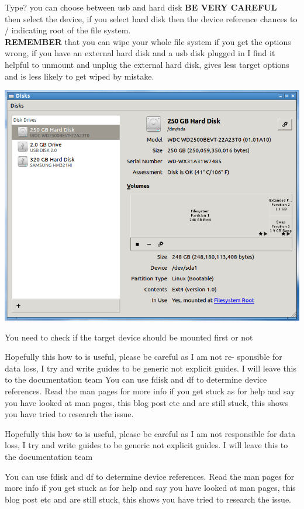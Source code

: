 \documentclass[12pt,a4paper]{book}
\begin{document}
Type? you can choose between usb and hard disk \textbf{BE VERY CAREFUL} \\

then select the device, if you select hard disk then the device reference chances to / indicating root of the file system. \\

\textbf{REMEMBER} that you can wipe your whole file system if you get the options wrong,  if you have an external hard disk and a usb disk plugged in I find it helpful to unmount and unplug the external hard disk,  gives less target options and is less likely to get wiped by mistake. \\

 
\begin{center}
\includegraphics[width=0.7\linewidth]{unetbootin4}
\end{center}
You need to check if the target device should be mounted first or not

Hopefully this how to is useful, please be careful as I am not re-
sponsible for data loss, I try and write guides to be generic not
explicit guides. I will leave this to the documentation team
You can use fdisk and df to determine device references. Read the
man pages for more info if you get stuck as for help and say you
have looked at man pages, this blog post etc and are still stuck,
this shows you have tried to research the issue.

Hopefully this how to is useful,  please be careful as I am not responsible for data loss,  I try and write guides to be generic not explicit guides.  I will leave this to the documentation team

You can use fdisk and df to determine device references. Read the man pages for more info if you get stuck as for help and say you have looked at man pages,  this blog post etc and are still stuck,  this shows you have tried to research the issue.
\end{document}
